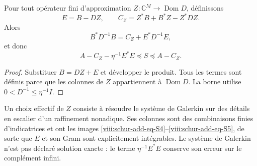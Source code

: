 \begin{theorem}
\label{viii:schur-add-residual}
Pour tout opérateur fini d'approximation \(Z:\mathbb C^M\to\operatorname{Dom}D\), définissons
\begin{equation}
E=B-DZ,\qquad C_Z=Z^*B+B^*Z-Z^*DZ.
\label{viii:schur-add-display-15}
\end{equation}
Alors
\begin{equation}
B^*D^{-1}B=C_Z+E^*D^{-1}E,
\label{viii:schur-add-display-16}
\end{equation}
et donc
\begin{equation}
\boxed{A-C_Z-\eta^{-1}E^*E\preceq S\preceq A-C_Z.}
\label{viii:schur-add-eq-S7}
\end{equation}
\end{theorem}
\begin{proof}
Substituer \(B=DZ+E\) et développer le produit. Tous les
termes sont définis parce que les colonnes de \(Z\) appartiennent à
\(\operatorname{Dom}D\). La borne utilise \(0<D^{-1}\leq\eta^{-1}I\).
\end{proof}

Un choix effectif de \(Z\) consiste à résoudre le système de Galerkin sur des détails en escalier d'un raffinement nonadique. Ses colonnes sont des combinaisons finies d'indicatrices et ont les images \eqref{viii:schur-add-eq-S4}--\eqref{viii:schur-add-eq-S5}, de sorte que \(E\) et son Gram sont explicitement intégrables. Le système de Galerkin n'est pas déclaré solution exacte : le terme \(\eta^{-1}E^*E\) conserve son erreur sur le complément infini.

